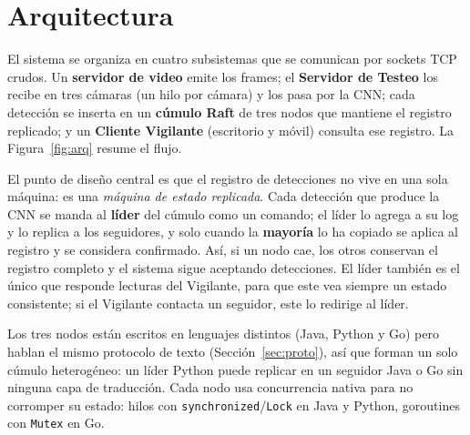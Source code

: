 \documentclass[11pt,a4paper]{article}
\begin{document}
\section{Arquitectura}\label{sec:arq}
El sistema se organiza en cuatro subsistemas que se comunican por sockets TCP
crudos. Un \textbf{servidor de video} emite los frames; el \textbf{Servidor de
Testeo} los recibe en tres c\'amaras (un hilo por c\'amara) y los pasa por la CNN;
cada detecci\'on se inserta en un \textbf{c\'umulo Raft} de tres nodos que mantiene
el registro replicado; y un \textbf{Cliente Vigilante} (escritorio y m\'ovil)
consulta ese registro. La Figura~\ref{fig:arq} resume el flujo.

El punto de dise\~no central es que el registro de detecciones no vive en una sola
m\'aquina: es una \emph{m\'aquina de estado replicada}. Cada detecci\'on que
produce la CNN se manda al \textbf{l\'ider} del c\'umulo como un comando; el l\'ider
lo agrega a su log y lo replica a los seguidores, y solo cuando la \textbf{mayor\'ia}
lo ha copiado se aplica al registro y se considera confirmado. As\'i, si un nodo
cae, los otros conservan el registro completo y el sistema sigue aceptando
detecciones. El l\'ider tambi\'en es el \'unico que responde lecturas del Vigilante,
para que este vea siempre un estado consistente; si el Vigilante contacta un
seguidor, este lo redirige al l\'ider.

Los tres nodos est\'an escritos en lenguajes distintos (Java, Python y Go) pero
hablan el mismo protocolo de texto (Secci\'on~\ref{sec:proto}), as\'i que forman un
solo c\'umulo heterog\'eneo: un l\'ider Python puede replicar en un seguidor Java o
Go sin ninguna capa de traducci\'on. Cada nodo usa concurrencia nativa para no
corromper su estado: hilos con \texttt{synchronized}/\texttt{Lock} en Java y Python,
goroutines con \texttt{Mutex} en Go.
\end{document}
